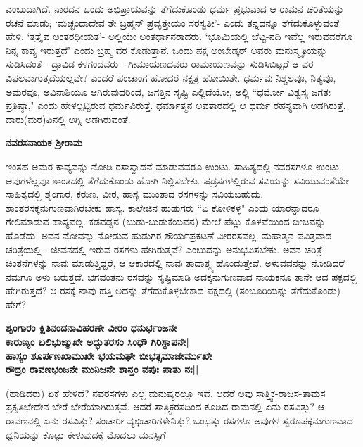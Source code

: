 ಎಂಬುದಾಗಿದೆ. ನಾರದನ ಒಂದು ಅಭಿಪ್ರಾಯವನ್ನು ತೆಗೆದುಕೊಂಡು ಧರ್ಮ ಪ್ರಭುವಾದ ಆ ರಾಮನ ಚರಿತೆಯನ್ನು ರಚನೆ ಮಾಡು; `ಮಚ್ಛಂದಾದೇವ ತೇ ಬ್ರಹ್ಮನ್‍ ಪ್ರವೃತ್ತೇಯಂ ಸರಸ್ವತೀ'- ಎಂದು ತನ್ನದನ್ನೂ ತೆಗೆದುಕೊಳ್ಳುವಂತೆ ಹೇಳಿ, `ತತ್ರೈವ ಅಂತರಧೀಯತ'- ಅಲ್ಲಿಯೇ ಅಂತರ್ಧಾನರಾದರು. `ಭೂಮಿಯಲ್ಲಿ ಬೆಟ್ಟ-ನದಿ ಇವೆಲ್ಲ ಇರುವವರೆಗೂ ನಿನ್ನ ಕಾವ್ಯ ಇರುತ್ತದೆ' ಎಂದು ಬ್ರಹ್ಮ ವರ ಕೊಡುತ್ತಾನೆ. ಒಂದು ಪಕ್ಷ ಅಂಬೇಡ್ಕರ್‍ ಅವರು ಮನುಸ್ಮೃತಿಯನ್ನು ಸುಡಿಸಿದಂತೆ - ದ್ರಾವಿಡ ಕಳಗಂದವರು - ಗೀಮಾಯಣದವರು ರಾಮಾಯಣವನ್ನು ಸುಡಿಸಿಬಿಟ್ಟರೆ ಆ ವರ ವಿಫಲವಾಗುತ್ತದೆಯಲ್ಲವೇ? ಎಂದರೆ ಪಂಚಾಂಗ ಹೋದರೆ ನಕ್ಷತ್ರ ಹೋಯಿತೇ. ಧರ್ಮವು ನಿಶ್ಚಲವೂ, ನಿತ್ಯವೂ, ಅಮರವೂ, ಅವಿನಾಶಿಯೂ ಆಗಿರುವುದರಿಂದ, ಜಗತ್ತಿನ ಸೃಷ್ಟಿ ಎಲ್ಲಿದೆಯೋ, ಅಲ್ಲಿ ``ಧರ್ಮೋ ವಿಶ್ವಸ್ಯ ಜಗತಃ ಪ್ರತಿಷ್ಠಾ," ಎಂದು ಹೇಳಲ್ಪಟ್ಟಿರುವ ಧರ್ಮವಿರುತ್ತೆ. ಧರ್ಮಾತ್ಮನ ಅವತಾರದಲ್ಲಿ ಆ ಧರ್ಮ ರಹಸ್ಯವಾಗಿ ಅಡಗಿರುತ್ತೆ, ದಾರು(ಮರ)ವಿನಲ್ಲಿ ಅಗ್ನಿ ಅಡಗಿರುವಂತೆ. 


{\bf ನವರಸನಾಯಕ ಶ್ರೀರಾಮ} 


ಇಂತಹ ಅಮರ ಕಾವ್ಯವನ್ನು ನೋಡಿ ರಸಾಸ್ವಾದನೆ ಮಾಡುವವರೂ ಉಂಟು. ಸಾಹಿತ್ಯದಲ್ಲಿ ನವರಸಗಳೂ ಉಂಟು. ಅವುಗಳೆಲ್ಲವೂ ಶಾಂತದಲ್ಲಿ ತೆಗೆದುಕೊಂಡು ಹೋಗಿ ನಿಲ್ಲಿಸಬೇಕು. ಷಡ್ರಸಗಳಲ್ಲಿರುವ ಸವಿಯನ್ನು ಸವಿಯುವಂತೆಯೇ ಸಾಹಿತ್ಯದಲ್ಲಿ ಶೃಂಗಾರ, ಕರುಣ, ವೀರ, ಹಾಸ್ಯ ಮುಂತಾದ ರಸಗಳನ್ನು ಸವಿಯಬಹುದು. ಶಾಂತರಸಕ್ಕನುಗುಣವಾಗಿರಬೇಕು ಹಾಸ್ಯ. ಕಾಲೇಜಿನ ಹುಡುಗರು ``ಏ ಕೋಳಿಕಳ್ಳ" ಎಂದು ಯಾರನ್ನಾದರೂ ಗೇಲಿಮಾಡುವ ಹಾಸ್ಯವಲ್ಲ. ಕಡವಡ್ಡನ (ಬುಡು-ಬುಡುಕೆಯವನ) ಮೇಲೆ ಪೆಟ್ಲು ಕೊಳವೆಯಿಂದ ಬೀಜವನ್ನು ಹೊಡೆದು, ಅವನ ನೋವನ್ನು ನೋಡುವ ಹುಡುಗರ ಶೌರ್ಯಪ್ರಕಟಣೆ ವೀರರಸವಲ್ಲ. ಮಹಾತ್ಮನ ಪವಿತ್ರವಾದ ಚರಿತ್ರೆಯಲ್ಲಿ - ಜೀವನದಲ್ಲಿ ಇರುವ ರಸಗಳು ಹೇಗಿರುತ್ತವೆ? ಎಂಬುದನ್ನು ಅನುಭವಿಸಬೇಕು. ಅವನ ಚರಿತ್ರೆ ಚಿಂತನೆಗಳನ್ನು ನಾವು ಮಾಡುತ್ತಿದ್ದರೆ, ಆ ಆಕಾರದಲ್ಲಿ ನಾವು ತಾದಾತ್ಮ್ಯ ಹೊಂದುತ್ತೇವೆ. ಅಳುವವನನ್ನು ನೋಡಿದರೆ ನಮಗೂ ಅಳು ಬರುತ್ತದೆ. ಭಗವಂತನು ರಸವನ್ನು ಸೃಷ್ಟಿಮಾಡಿ ಅದಕ್ಕನುಗುಣವಾದ ನಾಯಕನೂ ತಾನೇ ಆದ ಪಕ್ಷದಲ್ಲಿ ಹೇಗಿರುತ್ತದೆ? ಆ ರಸಕ್ಕೆ ನಾವು ಹತ್ತಿ ಅದನ್ನು ತೆಗೆದುಕೊಳ್ಳಬೇಕಾದ ಪಕ್ಷದಲ್ಲಿ (ತಂಬೂರಿಯನ್ನು ತೆಗೆದುಕೊಂಡು) ಹೇಗೆ? 


\begin{center} 

{\bf ಶೃಂಗಾರಂ ಕ್ಷಿತಿನಂದನಾವಿಹರಣೇ ವೀರಂ ಧನುರ್ಭಂಜನೇ\\ 

ಕಾರುಣ್ಯಂ ಬಲಿಭುಙ್ಮುಖೇ ಅದ್ಭುತರಸಂ ಸಿಂಧೌ ಗಿರಿಸ್ಥಾಪನೇ|\\ 

ಹಾಸ್ಯಂ ಶೂರ್ಪಣಖಾಮುಖೇ ಭಯಮಘೇ ಬೀಭತ್ಸಮಾಜೇರ್ಮುಖೇ\\ 

ರೌದ್ರಂ ರಾವಣಭಂಜನೇ ಮುನಿಜನೇ ಶಾನ್ತಂ ವಪುಃ ಪಾತು ನಃ||} 

\end{center} 


(ಹಾಡಿದರು) ಏಕೆ ಹೇಳಿದೆ? ನವರಸಗಳು ಎಲ್ಲ ಮನುಷ್ಯರಲ್ಲೂ ಇವೆ. ಆದರೆ ಅವು ಸಾತ್ತ್ವಿಕ-ರಾಜಸ-ತಾಮಸ ಪ್ರಕೃತಿಭೇದೇನ ಬೇರೆ ಬೇರೆಯಾಗಿರುತ್ತವೆ. ಆದರೆ ಸಾತ್ತ್ವಿಕರಸದಿಂದ ಕೂಡಿದ ರಾಮನಲ್ಲಿ ಏನು ರಸವಿತ್ತು? ಆ ರಾವಣನಲ್ಲಿ ಏನು ರಸವಿತ್ತು? ಸಂಚಾರೀ ವ್ಯಭಿಚಾರಿಗಳೇನಿತ್ತು? ಒಂಭತ್ತು ರಸಗಳೂ ಅವುಗಳ ಸ್ವರೂಪಕ್ಕನುಗುಣವಾದ ಧ್ವನಿಯನ್ನು ಕೊಟ್ಟು ಕೇಳುವುದಕ್ಕೆ ಮೊದಲು ಮನಸ್ಸಿಗೆ 

